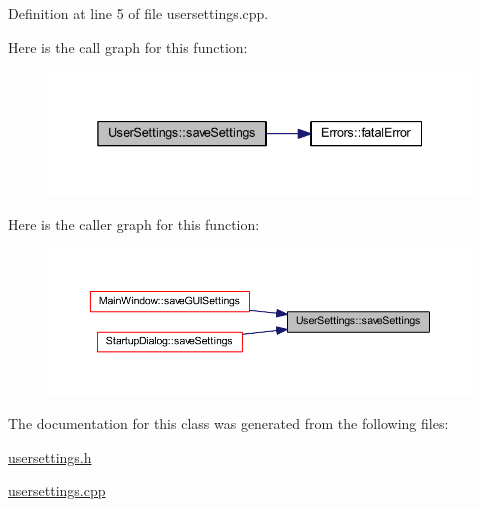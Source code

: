 Definition at line 5 of file usersettings.\+cpp.

Here is the call graph for this function\+:
\nopagebreak
\begin{figure}[H]
\begin{center}
\leavevmode
\includegraphics[width=338pt]{classUserSettings_a0ec1a38cad81b92041d4024a4862c738_cgraph}
\end{center}
\end{figure}
Here is the caller graph for this function\+:
\nopagebreak
\begin{figure}[H]
\begin{center}
\leavevmode
\includegraphics[width=350pt]{classUserSettings_a0ec1a38cad81b92041d4024a4862c738_icgraph}
\end{center}
\end{figure}


The documentation for this class was generated from the following files\+:\begin{DoxyCompactItemize}
\item 
\mbox{\hyperlink{usersettings_8h}{usersettings.\+h}}\item 
\mbox{\hyperlink{usersettings_8cpp}{usersettings.\+cpp}}\end{DoxyCompactItemize}
